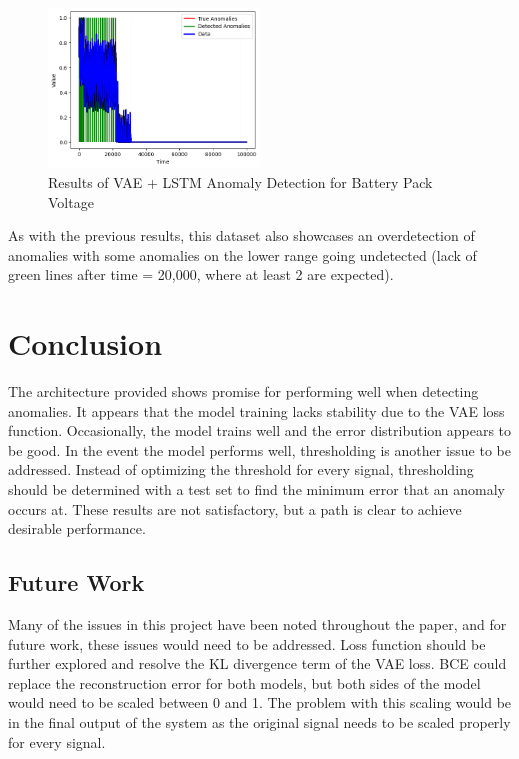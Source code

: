 \documentclass[conference]{IEEEtran}
\begin{document}
\begin{figure}[htbp]
    \centering
    \includegraphics[width=0.5\textwidth]{aj_fig_6.png}
    \caption{Results of VAE + LSTM Anomaly Detection for Battery Pack Voltage}
    \label{aj_fig__6}
\end{figure}

As with the previous results, this dataset also showcases an overdetection of anomalies with some anomalies on the lower range going undetected (lack of green lines after time = 20,000, where at least 2 are expected). 

\section{Conclusion}
The architecture provided shows promise for performing well when detecting anomalies. It appears that the model training lacks stability due to the VAE loss function. Occasionally, the model trains well and the error distribution appears to be good. In the event the model performs well, thresholding is another issue to be addressed. Instead of optimizing the threshold for every signal, thresholding should be determined with a test set to find the minimum error that an anomaly occurs at. These results are not satisfactory, but a path is clear to achieve desirable performance.

\subsection{Future Work}
Many of the issues in this project have been noted throughout the paper, and for future work, these issues would need to be addressed. Loss function should be further explored and resolve the KL divergence term of the VAE loss. BCE could replace the reconstruction error for both models, but both sides of the model would need to be scaled between 0 and 1. The problem with this scaling would be in the final output of the system as the original signal needs to be scaled properly for every signal.
\end{document}
